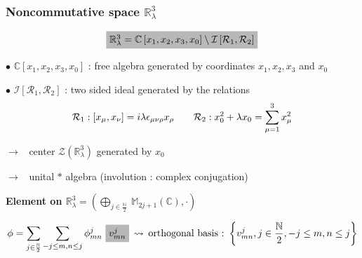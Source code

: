 \documentclass[9pt]{beamer}
\begin{document}
\begin{frame}

\frametitle{Noncommutative space $\mathbb{R}^3_\lambda$}

\vspace*{-10pt}

\begin{equation*}
\tikz[baseline]{\node[fill=black!28!white,anchor=base] (t1) {$\mathbb{R}^3_\lambda = \mathbb{C}\left[x_1,x_2,x_3,x_0\right] \setminus \mathcal{I}\left[\mathcal{R}_1,\mathcal{R}_2\right]$
}
;}
\end{equation*}

$\bullet$ $\mathbb{C}\left[x_1,x_2,x_3,x_0\right]$ : free algebra generated by coordinates $x_1, x_2, x_3$ and $x_0$

\vspace*{8pt}

$\bullet$ $\mathcal{I}\left[\mathcal{R}_1,\mathcal{R}_2\right]$ : two sided ideal generated by the relations
\vspace*{-5pt}
\begin{equation*}
\mathcal{R}_1 : \left[x_\mu,x_\nu\right] = i \lambda \epsilon_{\mu\nu\rho} x_\rho \qquad
\mathcal{R}_2 : x_0^2 + \lambda x_0 = \sum_{\mu=1}^{3} x_\mu^2
\vspace*{-5pt}
\end{equation*}

\quad $\to$ \ center $\mathcal{Z}\left(\mathbb{R}^3_\lambda\right)$ generated by $x_0$

\vspace*{4pt}

\quad $\to$ \ unital $\ast$ algebra (involution : complex conjugation)

\vspace*{8pt}

\textbf{Element on $\mathbb{R}^3_\lambda = \left(
\underset{j\in\frac{\mathbb{N}}{2}}{\bigoplus} \ \mathbb{M}_{2j+1}\left(\mathbb{C}\right), \cdot\right)$}

\vspace*{1pt}

\begin{equation*}
\phi = \sum_{j\in\frac{\mathbb{N}}{2}} \sum_{-j \leq m, n \leq j} \phi^j_{mn} \ 
\tikz[baseline]{\node[fill=black!28!white,anchor=base] (t1) {$v^j_{mn}$};} \hspace*{2pt} \leadsto \hspace*{2pt} \mbox{orthogonal basis :} \ \left\{ v^j_{mn} , j\in\frac{\mathbb{N}}{2} , -j \leq m,n \leq j \right\} 
\vspace*{-5pt}
\end{equation*}


\end{frame}
\end{document}
